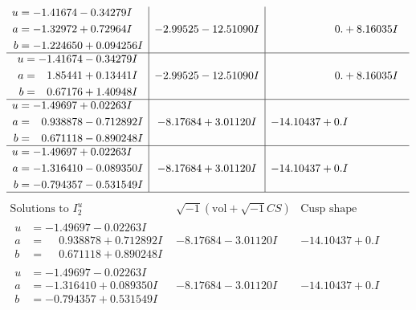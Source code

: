 \documentclass[1p]{elsarticle_modified}
\theoremstyle{definition}
\newcommand{\I}{\sqrt{-1}}
\begin{document}
$$\begin{array}{c|c|c}
\begin{aligned}
u &= -1.41674 - 0.34279 I \\
a &= -1.32972 + 0.72964 I \\
b &= -1.224650 + 0.094256 I\end{aligned}
 & -2.99525 - 12.51090 I & \phantom{-0.000000 -}0. + 8.16035 I \\ \hline\begin{aligned}
u &= -1.41674 - 0.34279 I \\
a &= \phantom{-}1.85441 + 0.13441 I \\
b &= \phantom{-}0.67176 + 1.40948 I\end{aligned}
 & -2.99525 - 12.51090 I & \phantom{-0.000000 -}0. + 8.16035 I \\ \hline\begin{aligned}
u &= -1.49697 + 0.02263 I \\
a &= \phantom{-}0.938878 - 0.712892 I \\
b &= \phantom{-}0.671118 - 0.890248 I\end{aligned}
 & -8.17684 + 3.01120 I & -14.10437 + 0. I\phantom{ +0.000000I} \\ \hline\begin{aligned}
u &= -1.49697 + 0.02263 I \\
a &= -1.316410 - 0.089350 I \\
b &= -0.794357 - 0.531549 I\end{aligned}
 & -8.17684 + 3.01120 I & -14.10437 + 0. I\phantom{ +0.000000I}\\
 \hline 
 \end{array}$$\newpage$$\begin{array}{c|c|c}  
\text{Solutions to }I^u_{2}& \I (\text{vol} + \sqrt{-1}CS) & \text{Cusp shape}\\
 \hline 
\begin{aligned}
u &= -1.49697 - 0.02263 I \\
a &= \phantom{-}0.938878 + 0.712892 I \\
b &= \phantom{-}0.671118 + 0.890248 I\end{aligned}
 & -8.17684 - 3.01120 I & -14.10437 + 0. I\phantom{ +0.000000I} \\ \hline\begin{aligned}
u &= -1.49697 - 0.02263 I \\
a &= -1.316410 + 0.089350 I \\
b &= -0.794357 + 0.531549 I\end{aligned}
 & -8.17684 - 3.01120 I & -14.10437 + 0. I\phantom{ +0.000000I} \\ \hline\begin{aligned}

\end{aligned}
\end{array}$$
\end{document}
